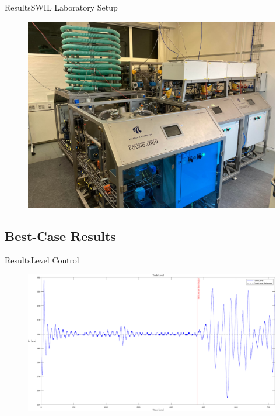 \begin{frame}{Results}{SWIL Laboratory Setup}
	\begin{figure}[h!]
		\includegraphics[width=\linewidth]{Graphics/SWIL.pdf}
		\label{fig:AAUSWIL}
	\end{figure}
\end{frame}


\subsection{Best-Case Results}

\begin{frame}{Results}{Level Control}
	\begin{figure}[h!]
		\includegraphics[width=\linewidth]{Graphics/OuterLoop.pdf}
		\label{fig:OuterLoop}
	\end{figure}
\end{frame}

